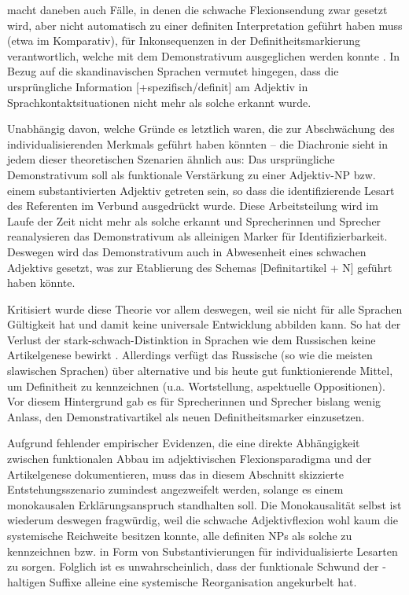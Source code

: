\textcite[44]{Ebert1978} macht daneben \parencite[mit Verweis auf][]{Kuhn1955} auch Fälle, in denen die schwache Flexionsendung zwar gesetzt wird, aber nicht automatisch zu einer definiten Interpretation geführt haben muss (etwa im Komparativ), für Inkonsequenzen in der Definitheitsmarkierung verantwortlich, welche mit dem Demonstrativum ausgeglichen werden konnte \parencite[vgl. zu dieser Argumentation auch][25]{Kovari1984}. In Bezug auf die skandinavischen Sprachen vermutet \textcite{Braunmuller2013} hingegen, dass die ursprüngliche Information [+spezifisch/definit] am Adjektiv in Sprachkontaktsituationen nicht mehr als solche erkannt wurde. 

Unabhängig davon, welche Gründe es letztlich waren, die zur Abschwächung des individualisierenden Merkmals geführt haben könnten -- die Diachronie sieht in jedem dieser theoretischen Szenarien ähnlich aus: Das ursprüngliche Demonstrativum soll als funktionale Verstärkung zu einer Adjektiv-NP bzw. einem substantivierten Adjektiv getreten sein, so dass die identifizierende Lesart des Referenten im Verbund ausgedrückt wurde. Diese Arbeitsteilung wird im Laufe der Zeit nicht mehr als solche erkannt und Sprecherinnen und Sprecher reanalysieren das Demonstrativum als alleinigen Marker für Identifizierbarkeit. Deswegen wird das Demonstrativum auch in Abwesenheit eines schwachen Adjektivs gesetzt, was zur Etablierung des Schemas [Definitartikel + N] geführt haben könnte.     

Kritisiert wurde diese Theorie vor allem deswegen, weil sie nicht für alle Sprachen Gültigkeit hat und damit keine universale Entwicklung abbilden kann. So hat der Verlust der stark-schwach-Distinktion in Sprachen wie dem Russischen keine Artikelgenese bewirkt \parencite[][64]{Philippi1997}. Allerdings verfügt das Russische (so wie die meisten slawischen Sprachen) über alternative und bis heute gut funktionierende Mittel, um Definitheit zu kennzeichnen (u.a. Wortstellung, aspektuelle Oppositionen). Vor diesem Hintergrund gab es für Sprecherinnen und Sprecher bislang wenig Anlass,  den Demonstrativartikel als neuen Definitheitsmarker einzusetzen.

Aufgrund fehlender empirischer Evidenzen, die eine direkte Abhängigkeit zwischen funktionalen Abbau im adjektivischen Flexionsparadigma und der Artikelgenese dokumentieren, muss das in diesem Abschnitt skizzierte Entstehungsszenario  zumindest angezweifelt werden, solange es einem monokausalen Erklärungsanspruch standhalten soll. Die Monokausalität selbst ist wiederum deswegen fragwürdig, weil  die schwache Adjektivflexion wohl kaum die systemische Reichweite besitzen konnte,  alle definiten NPs als solche zu kennzeichnen bzw. in Form von Substantivierungen  für individualisierte Lesarten zu sorgen. Folglich ist es unwahrscheinlich, dass der funktionale Schwund der -haltigen Suffixe alleine eine systemische Reorganisation angekurbelt hat. 

